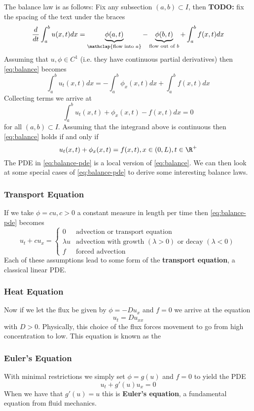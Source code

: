 \documentclass{bkcnotes}
\newcommand{\todo}[1]{{\bf TODO: } #1\\}
\begin{document}
The balance law is as follows: Fix any subsection $(a,b) \subset
I$, then
\todo{fix the spacing of the text under the braces}
\begin{equation}
  \label{eq:balance}
  \frac{d}{dt} \int_a^b u(x,t)dx =
  \underbrace{\phi(a,t)}_{\mathclap{\text{flow into } a}} -
  \underbrace{\phi(b,t)}_{\text{flow out of } b} +
  \int_a^b f(x,t)dx
\end{equation}
Assuming that $u,\phi \in C^1$ (i.e. they have continuous partial
derivatives) then \eqref{eq:balance} becomes
\[
\int_a^b u_t(x,t)dx = -\int_a^b \phi_x(x,t)dx + \int_a^b f(x,t)dx
\]
Collecting terms we arrive at
\[
\int_a^b u_t(x,t) + \phi_x(x,t) - f(x,t)dx = 0
\]
for all $(a,b) \subset I$. Assuming that the integrand above is
continuous then \eqref{eq:balance} holds if and only if
\begin{equation}
  \label{eq:balance-pde}
  u_t(x,t) + \phi_x(x,t) = f(x,t), x \in (0,L), t \in \R^+
\end{equation}
The PDE in \eqref{eq:balance-pde} is a local version of \eqref{eq:balance}. We
can then look at some special cases of \eqref{eq:balance-pde} to derive
some interesting balance laws.
\subsubsection{Transport Equation}
If we take $\phi = cu, c > 0$ a constant measure in length per time
then \eqref{eq:balance-pde} becomes
\[
u_t + cu_x =
\begin{cases}
  0         & \text{advection or transport equation} \\
  \lambda u & \text{advection with growth }(\lambda > 0)
              \text{ or decay }(\lambda < 0) \\
  f         & \text{forced advection}
\end{cases}
\]
Each of these assumptions lead to some form of the {\bf transport
  equation}, a classical linear PDE.

\subsubsection{Heat Equation}
Now if we let the flux be given by $\phi = - Du_x$ and $f = 0$ we
arrive at the equation
\[
u_t = Du_{xx}
\]
with $D > 0$. Physically, this choice of the flux forces movement to
go from high concentration to low. This equation is known as the {\bf}

\subsubsection{Euler's Equation}
With minimal restrictions we simply set $\phi = g(u)$ and $f = 0$ to
yield the PDE
\[
u_t + g'(u)u_x = 0
\]
When we have that $g'(u) = u$ this is {\bf Euler's equation}, a
fundamental equation from fluid mechanics.
\end{document}
